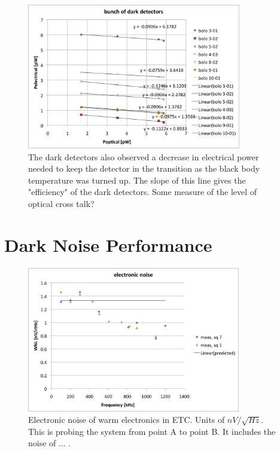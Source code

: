 \begin{figure}[ht!]
\begin{center}
\includegraphics[height=2.5in]{figures/darkdetectoreffs}
\caption{The dark detectors also observed a decrease in electrical power needed to keep the detector in the transition as the black body temperature was turned up. The slope of this line gives the "efficiency" of the dark detectors. Some measure of the level of optical cross talk?
\label{fig:dark_optical_efficiencies} }
\end{center}
\end{figure}




\section{Dark Noise Performance}
\label{sec:dark_nosie}


\begin{figure}[ht!]
\begin{center}
\includegraphics[height=2.5in]{figures/electronic_noise_sq1_sq7}
\caption{Electronic noise of warm electronics in \ac{ETC}. Units of $nV/\sqrt{Hz}$. This is probing the system from point A to point B. It includes the noise of ... .
\label{fig:dark_electronic_noise} }
\end{center}
\end{figure}

